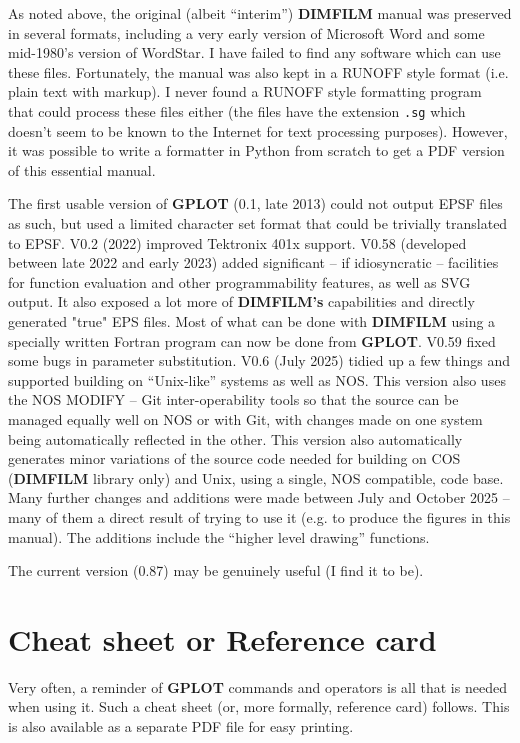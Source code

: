 \documentclass[a4paper,twoside,11pt]{article}
\newcommand{\newpara}{\par\vspace{4mm}\noindent}
\begin{document}
\newpara
As noted above,
the original (albeit ``interim'') \textbf{DIMFILM} manual was preserved in several formats, including a very early version
of Microsoft Word and some mid-1980's version of WordStar. I have failed to find any software which can use these
files. Fortunately, the manual was also kept in a RUNOFF style format (i.e. plain text with markup). I never found
a RUNOFF style formatting program that could process these files either (the files have the extension \texttt{.sg} which
doesn't seem to be known to the Internet for text processing purposes). However, it was possible to write a
formatter in Python from scratch to get a PDF version of this essential manual.

\newpara
The first usable version of \textbf{GPLOT} (0.1, late 2013) 
could not output EPSF files as such, but used a
limited character set format that could be trivially translated to EPSF. V0.2 (2022) improved Tektronix 401x support. V0.58
(developed between late 2022 and early 2023) added significant -- if idiosyncratic -- facilities for function evaluation 
and other programmability features, as well as SVG output. It also exposed a lot more of \textbf{DIMFILM's} capabilities and directly
generated "true" EPS files. Most of what can be done with \textbf{DIMFILM} using a specially
written Fortran program can now be done from \textbf{GPLOT}. V0.59 fixed some bugs in parameter substitution. V0.6 (July 2025)
tidied up a few things and supported building on ``Unix-like'' systems as well as NOS. This version also uses the NOS MODIFY --
Git inter-operability tools so that the source can be managed equally well on NOS or with Git, with changes made on one system
being automatically reflected in the other. This version also automatically generates minor variations of the source code
needed for building on COS (\textbf{DIMFILM} library only) and Unix, using a single, NOS compatible,
code base. Many further changes and additions were made
between July and October 2025 -- many of them a direct result of trying to use it (e.g. to produce the figures
in this manual). The additions include the ``higher level drawing'' functions.

\newpara
The current version (0.87) may be genuinely useful (I find it to be).

\section{Cheat sheet or Reference card}
Very often, a reminder of \textbf{GPLOT} commands and operators is all that is needed when
using it. Such a cheat sheet (or, more formally, reference card) follows. This is
also available as a separate PDF file for easy printing.
\end{document}

